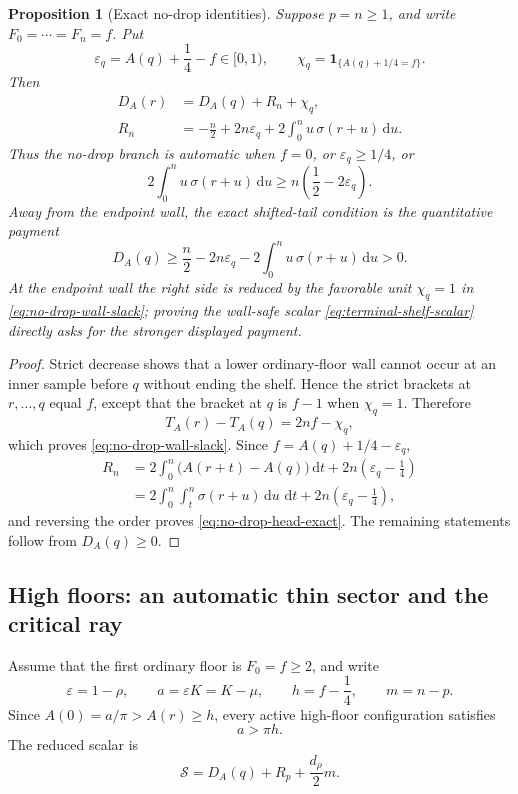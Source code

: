 \documentclass[11pt]{article}
\newtheorem{proposition}[theorem]{Proposition}
\theoremstyle{remark}
\newcommand{\dd}{\,\mathrm d}
\begin{document}
\begin{proposition}[Exact no-drop identities]
\label{prop:no-drop-identities}
Suppose $p=n\geq1$, and write
$F_0=\cdots=F_n=f$.  Put
\[
 \varepsilon_q=A(q)+\frac14-f\in[0,1),
 \qquad
 \chi_q=\mathbf 1_{\{A(q)+1/4=f\}}.
\]
Then
\begin{align}
 D_A(r)&=D_A(q)+R_n+\chi_q,
 \label{eq:no-drop-wall-slack}\\
 R_n&=-\frac n2+2n\varepsilon_q
 +2\int_0^n u\,\sigma(r+u)\dd u.
 \label{eq:no-drop-head-exact}
\end{align}
Thus the no-drop branch is automatic when
$f=0$, or $\varepsilon_q\geq1/4$, or
\[
 2\int_0^n u\,\sigma(r+u)\dd u
 \geq n\left(\frac12-2\varepsilon_q\right).
\]
Away from the endpoint wall, the exact shifted-tail condition is the
quantitative payment
\begin{equation}
 D_A(q)\geq
 \frac n2-2n\varepsilon_q
 -2\int_0^n u\,\sigma(r+u)\dd u>0.
 \label{eq:no-drop-terminal-payment}
\end{equation}
At the endpoint wall the right side is reduced by the favorable unit
$\chi_q=1$ in \eqref{eq:no-drop-wall-slack}; proving the wall-safe scalar
\eqref{eq:terminal-shelf-scalar} directly asks for the stronger displayed
payment.
\end{proposition}

\begin{proof}
Strict decrease shows that a lower ordinary-floor wall cannot occur at an
inner sample before $q$ without ending the shelf.  Hence the strict
brackets at $r,\ldots,q$ equal $f$, except that the bracket at $q$ is
$f-1$ when $\chi_q=1$.  Therefore
\[
 T_A(r)-T_A(q)=2nf-\chi_q,
\]
which proves \eqref{eq:no-drop-wall-slack}.  Since
$f=A(q)+1/4-\varepsilon_q$,
\[
 \begin{aligned}
 R_n
 &=2\int_0^n\bigl(A(r+t)-A(q)\bigr)\dd t
   +2n\left(\varepsilon_q-\frac14\right)\\
 &=2\int_0^n\int_t^n\sigma(r+u)\dd u\,\dd t
   +2n\left(\varepsilon_q-\frac14\right),
 \end{aligned}
\]
and reversing the order proves \eqref{eq:no-drop-head-exact}.
The remaining statements follow from $D_A(q)\geq0$.
\end{proof}

\subsection{High floors: an automatic thin sector and the critical ray}

Assume that the first ordinary floor is $F_0=f\geq2$, and write
\begin{equation}
 \varepsilon=1-\rho,\qquad a=\varepsilon K=K-\mu,
 \qquad h=f-\frac14,\qquad m=n-p.
 \label{eq:high-floor-scaled-data}
\end{equation}
Since $A(0)=a/\pi>A(r)\geq h$, every active high-floor configuration
satisfies
\begin{equation}
 a>\pi h.
 \label{eq:high-floor-active-width}
\end{equation}
The reduced scalar is
\[
 \mathcal S=D_A(q)+R_p+\frac{d_\rho}{2}m.
\]
\end{document}
